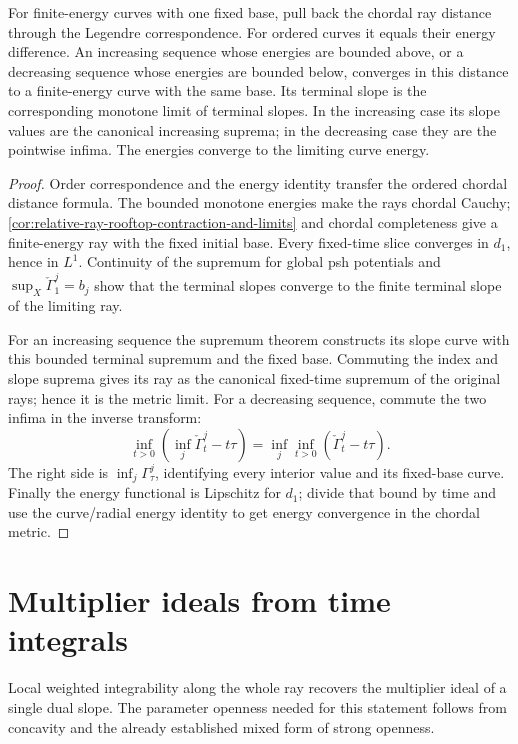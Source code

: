\begin{corollary}\label{cor:test-curve-ordered-energy-limits}
For finite-energy curves with one fixed base, pull back the chordal ray distance through the Legendre correspondence. For ordered curves it equals their energy difference. An increasing sequence whose energies are bounded above, or a decreasing sequence whose energies are bounded below, converges in this distance to a finite-energy curve with the same base. Its terminal slope is the corresponding monotone limit of terminal slopes. In the increasing case its slope values are the canonical increasing suprema; in the decreasing case they are the pointwise infima. The energies converge to the limiting curve energy.
\end{corollary}
\begin{proof}
Order correspondence and the energy identity transfer the ordered chordal distance formula. The bounded monotone energies make the rays chordal Cauchy; \cref{cor:relative-ray-rooftop-contraction-and-limits} and chordal completeness give a finite-energy ray with the fixed initial base. Every fixed-time slice converges in $d_1$, hence in $L^1$. Continuity of the supremum for global psh potentials and $\sup_X\check\Gamma^j_1=b_j$ show that the terminal slopes converge to the finite terminal slope of the limiting ray.

For an increasing sequence the supremum theorem constructs its slope curve with this bounded terminal supremum and the fixed base. Commuting the index and slope suprema gives its ray as the canonical fixed-time supremum of the original rays; hence it is the metric limit. For a decreasing sequence, commute the two infima in the inverse transform:
\[
 \inf_{t>0}\left(\inf_j\check\Gamma^j_t-t\tau\right)
               =\inf_j\inf_{t>0}(\check\Gamma^j_t-t\tau).
\]
The right side is $\inf_j\Gamma^j_\tau$, identifying every interior value and its fixed-base curve. Finally the energy functional is Lipschitz for $d_1$; divide that bound by time and use the curve/radial energy identity to get energy convergence in the chordal metric.
\end{proof}

\section{Multiplier ideals from time integrals}
\label{sec:ray-multiplier-integrals}
Local weighted integrability along the whole ray recovers the multiplier ideal of a single dual slope. The parameter openness needed for this statement follows from concavity and the already established mixed form of strong openness.

